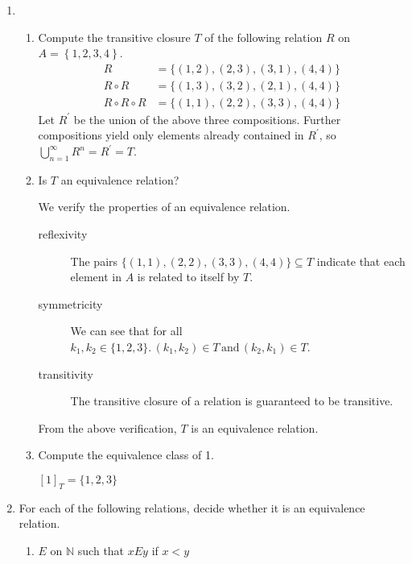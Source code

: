\documentclass{article}
\newcommand*{\problem}{}
\newcommand{\N}{\mathbb{N}}
\begin{document}
\begin{enumerate}
\begin{enumerate}
        \end{enumerate}

    \item 
        \begin{enumerate}
            \item \problem{Compute the transitive closure $T$ of the following relation $R$ on 
                $A = \left\{1, 2, 3, 4\right\}$.}
                \begin{align*}
                    R                 &= \{(1, 2), (2, 3), (3, 1), (4, 4)\} \\
                    R \circ R         &= \{(1, 3), (3, 2), (2, 1), (4, 4)\} \\
                    R \circ R \circ R &= \{(1, 1), (2, 2), (3, 3), (4, 4)\} 
                \end{align*}
                Let $R^\prime$ be the union of the above three compositions. Further compositions yield only
                elements already contained in $R^\prime$, so $\bigcup_{n=1}^\infty R^n = R^\prime = T$.
                
            \item \problem{Is $T$ an equivalence relation?}

                We verify the properties of an equivalence relation.
                \begin{description}
                    \item[reflexivity] The pairs $\{(1,1),(2,2),(3,3),(4,4)\} \subseteq
                    T$ indicate that each element in $A$ is related to itself by $T$.

                    \item[symmetricity] We can see that for all $k_1, k_2 \in \{1, 2, 3\}.\, (k_1, k_2)
                        \in T \, \mathrm{and} \, (k_2, k_1) \in T$.

                    \item[transitivity] The transitive closure of a relation is guaranteed to be
                        transitive.
                \end{description}
                From the above verification, $T$ is an equivalence relation.

            \item \problem{Compute the equivalence class of 1.}

                $\left[1\right]_T = \{1, 2, 3\}$
        \end{enumerate}

    \item \problem{For each of the following relations, decide whether it is an equivalence
        relation.}
        \begin{enumerate}
            \item $E$ on $\N$ such that $x E y$ if $x < y$


\end{enumerate}
\end{enumerate}
\end{document}
